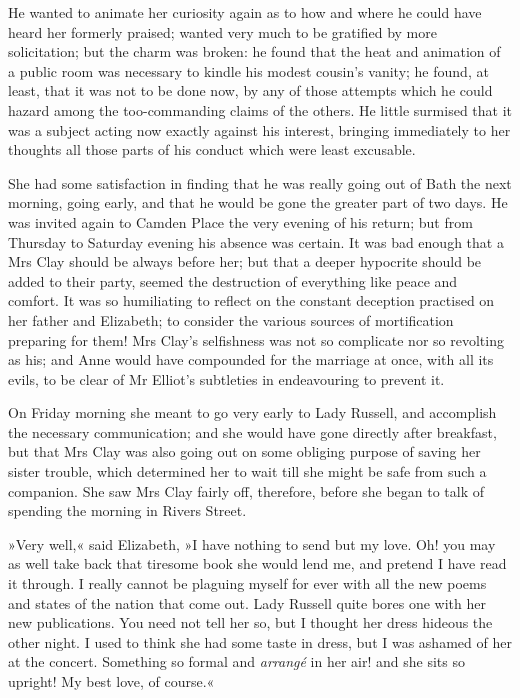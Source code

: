 He wanted to animate her curiosity again as to how and where he could have heard her formerly praised; wanted very much to be gratified by more solicitation; but the charm was broken: he found that the heat and animation of a public room was necessary to kindle his modest cousin's vanity; he found, at least, that it was not to be done now, by any of those attempts which he could hazard among the too-commanding claims of the others. He little surmised that it was a subject acting now exactly against his interest, bringing immediately to her thoughts all those parts of his conduct which were least excusable.

She had some satisfaction in finding that he was really going out of Bath the next morning, going early, and that he would be gone the greater part of two days. He was invited again to Camden Place the very evening of his return; but from Thursday to Saturday evening his absence was certain. It was bad enough that a Mrs Clay should be always before her; but that a deeper hypocrite should be added to their party, seemed the destruction of everything like peace and comfort. It was so humiliating to reflect on the constant deception practised on her father and Elizabeth; to consider the various sources of mortification preparing for them! Mrs Clay's selfishness was not so complicate nor so revolting as his; and Anne would have compounded for the marriage at once, with all its evils, to be clear of Mr Elliot's subtleties in endeavouring to prevent it.

On Friday morning she meant to go very early to Lady Russell, and accomplish the necessary communication; and she would have gone directly after breakfast, but that Mrs Clay was also going out on some obliging purpose of saving her sister trouble, which determined her to wait till she might be safe from such a companion. She saw Mrs Clay fairly off, therefore, before she began to talk of spending the morning in Rivers Street.

»Very well,« said Elizabeth, »I have nothing to send but my love. Oh! you may as well take back that tiresome book she would lend me, and pretend I have read it through. I really cannot be plaguing myself for ever with all the new poems and states of the nation that come out. Lady Russell quite bores one with her new publications. You need not tell her so, but I thought her dress hideous the other night. I used to think she had some taste in dress, but I was ashamed of her at the concert. Something so formal and \textit{arrangé} in her air! and she sits so upright! My best love, of course.«

